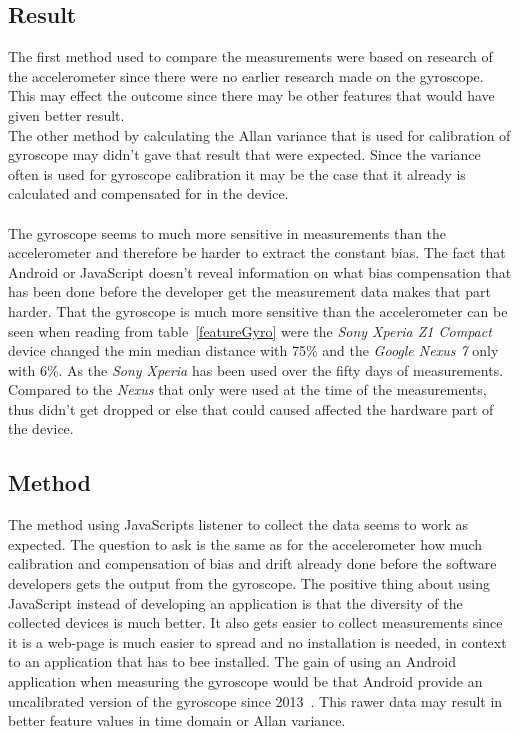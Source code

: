 \subsection{Result}
The first method used to compare the measurements were based on research of the accelerometer since there were no earlier research made on the gyroscope. This may effect the outcome since there may be other features that would have given better result. \\
The other method by calculating the Allan variance that is used for calibration of gyroscope may didn't gave that result that were expected. Since the variance often is used for gyroscope calibration it may be the case that it already is calculated and compensated for in the device.\\
\\
The gyroscope seems to much more sensitive in measurements than the accelerometer and therefore be harder to extract the constant bias. The fact that Android or JavaScript doesn't reveal information on what bias compensation that has been done before the developer get the measurement data makes that part harder. That the gyroscope is much more sensitive than the accelerometer can be seen when reading from table~\ref{featureGyro} were the \textit{Sony Xperia Z1 Compact} device changed the min median distance with 75\% and the \textit{Google Nexus 7} only with 6\%. As the \textit{Sony Xperia} has been used over the fifty days of measurements. Compared to the \textit{Nexus} that only were used at the time of the measurements, thus didn't get dropped or else that could caused affected the hardware part of the device.
\subsection{Method}
The method using JavaScripts listener to collect the data seems to work as expected. The question to ask is the same as for the accelerometer how much calibration and compensation of bias and drift already done before the software developers gets the output from the gyroscope. The positive thing about using JavaScript instead of developing an application is that the diversity of the collected devices is much better. It also gets easier to collect measurements since it is a web-page is much easier to spread and no installation is needed, in context to an application that has to bee installed. The gain of using an Android application when measuring the gyroscope would be that Android provide an uncalibrated version of the gyroscope since 2013~\cite{android:API18}. This rawer data may result in better feature values in time domain or Allan variance.


